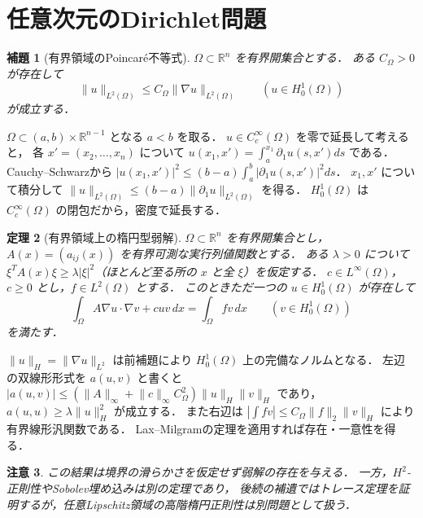 \documentclass[a5paper,10pt,onecolumn]{jsarticle}
\makeatletter
\theoremstyle{mathnotetheorem}
\newtheorem{theorem}{定理}[section]
\newtheorem{lemma}[theorem]{補題}
\newtheorem{remark}[theorem]{注意}
\renewcommand{\proofname}{証明}
\renewenvironment{proof}[1][\proofname]{%
  \par\pushQED{\qed}\normalfont\topsep4\p@\@plus2\p@\relax
  \trivlist\item[\hskip\labelsep\bfseries #1]\ignorespaces
}{\popQED\endtrivlist\@endpefalse}
\newcommand{\norm}[1]{\lVert #1\rVert}
\makeatother
\begin{document}
\section{任意次元のDirichlet問題}
\begin{lemma}[有界領域のPoincar\'e不等式]
$\Omega\subset\mathbb R^n$ を有界開集合とする．
ある $C_\Omega>0$ が存在して
\[
 \norm u_{L^2(\Omega)}\le C_\Omega
 \norm{\nabla u}_{L^2(\Omega)}\qquad
 (u\in H_0^1(\Omega))
\]
が成立する．
\end{lemma}
\begin{proof}
$\Omega\subset(a,b)\times\mathbb R^{n-1}$ となる $a<b$ を取る．
$u\in C_c^\infty(\Omega)$ を零で延長して考えると，
各 $x'=(x_2,\ldots,x_n)$ について
$u(x_1,x')=\int_a^{x_1}\partial_1u(s,x')ds$ である．
Cauchy--Schwarzから
$|u(x_1,x')|^2\le(b-a)\int_a^b|\partial_1u(s,x')|^2ds$．
$x_1,x'$ について積分して
$\norm u_{L^2(\Omega)}\le(b-a)\norm{\partial_1u}_{L^2(\Omega)}$ を得る．
$H_0^1(\Omega)$ は $C_c^\infty(\Omega)$ の閉包だから，密度で延長する．
\end{proof}
\begin{theorem}[有界領域上の楕円型弱解]
$\Omega\subset\mathbb R^n$ を有界開集合とし，
$A(x)=(a_{ij}(x))$ を有界可測な実行列値関数とする．
ある $\lambda>0$ について
$\xi^TA(x)\xi\ge\lambda|\xi|^2$（ほとんど至る所の $x$ と全 $\xi$）を仮定する．
$c\in L^\infty(\Omega)$，$c\ge0$ とし，$f\in L^2(\Omega)$ とする．
このときただ一つの $u\in H_0^1(\Omega)$ が存在して
\[
 \int_\Omega A\nabla u\cdot\nabla v+cuv\,dx
 =\int_\Omega fv\,dx\qquad(v\in H_0^1(\Omega))
\]
を満たす．
\end{theorem}
\begin{proof}
$\norm u_H=\norm{\nabla u}_{L^2}$ は前補題により
$H_0^1(\Omega)$ 上の完備なノルムとなる．
左辺の双線形形式を $a(u,v)$ と書くと
$|a(u,v)|\le(\norm A_\infty+\norm c_\infty C_\Omega^2)
\norm u_H\norm v_H$ であり，
$a(u,u)\ge\lambda\norm u_H^2$ が成立する．
また右辺は
$|\int fv|\le C_\Omega\norm f_2\norm v_H$ により有界線形汎関数である．
Lax--Milgramの定理を適用すれば存在・一意性を得る．
\end{proof}
\begin{remark}
この結果は境界の滑らかさを仮定せず弱解の存在を与える．
一方，$H^2$-正則性やSobolev埋め込みは別の定理であり，
後続の補遺ではトレース定理を証明するが，任意Lipschitz領域の高階楕円正則性は別問題として扱う．
\end{remark}
\end{document}

